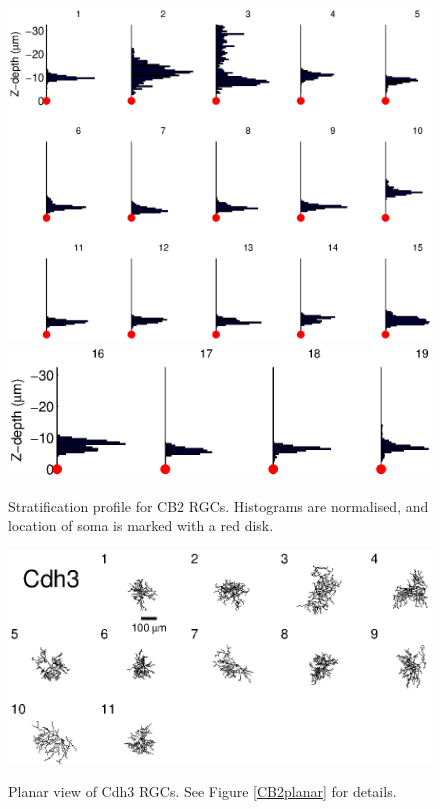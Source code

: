 \documentclass{article}
\begin{document}
\begin{figure}
  \centering
  {\includegraphics[scale=1]{Figures/SupFig2/CB2-stratification-depth-1}}
  {\includegraphics[scale=1]{Figures/SupFig2/CB2-stratification-depth-16}}
  \caption{Stratification profile for CB2 RGCs. Histograms are
    normalised, and location of soma is marked with a red disk. \label{CB2depth}}
\end{figure}



\clearpage


\begin{figure}
  \centering
  {\includegraphics[scale=1.5]{Figures/SupFig1/Cdh3-all-cells-1.eps}}
  \caption{Planar view of Cdh3 RGCs. See Figure \ref{CB2planar} for details.}
\end{figure}
\end{document}
